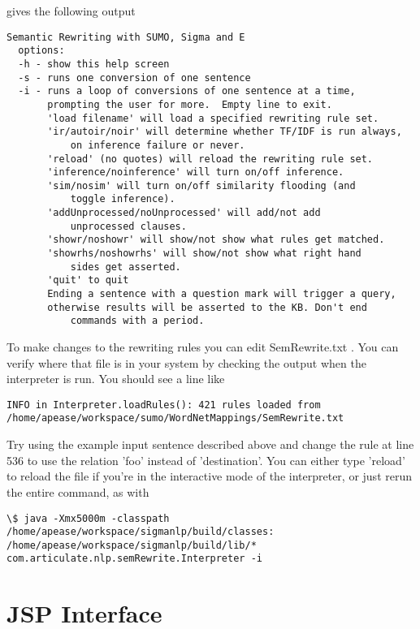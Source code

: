 \documentclass{book}
\begin{document}
gives the following output

\begin{verbatim}
Semantic Rewriting with SUMO, Sigma and E
  options:
  -h - show this help screen
  -s - runs one conversion of one sentence
  -i - runs a loop of conversions of one sentence at a time,
       prompting the user for more.  Empty line to exit.
       'load filename' will load a specified rewriting rule set.
       'ir/autoir/noir' will determine whether TF/IDF is run always, 
           on inference failure or never.
       'reload' (no quotes) will reload the rewriting rule set.
       'inference/noinference' will turn on/off inference.
       'sim/nosim' will turn on/off similarity flooding (and 
           toggle inference).
       'addUnprocessed/noUnprocessed' will add/not add 
           unprocessed clauses.
       'showr/noshowr' will show/not show what rules get matched.
       'showrhs/noshowrhs' will show/not show what right hand 
           sides get asserted.
       'quit' to quit
       Ending a sentence with a question mark will trigger a query,
       otherwise results will be asserted to the KB. Don't end 
           commands with a period.
\end{verbatim}

To make changes to the rewriting rules you can edit SemRewrite.txt .  You can verify
where that file is in your system by checking the output when the interpreter is run.
You should see a line like

\begin{verbatim}
INFO in Interpreter.loadRules(): 421 rules loaded from 
/home/apease/workspace/sumo/WordNetMappings/SemRewrite.txt
\end{verbatim}

Try using the example input sentence described above and change the rule at line 536
to use the relation 'foo' instead of 'destination'.  You can either type 'reload'
to reload the file if you're in the interactive mode of the interpreter, or just rerun
the entire command, as with

\begin{verbatim}
\$ java -Xmx5000m -classpath /home/apease/workspace/sigmanlp/build/classes:
/home/apease/workspace/sigmanlp/build/lib/*  
com.articulate.nlp.semRewrite.Interpreter -i
\end{verbatim}

\section{JSP Interface}
\label{chap:KnowEngi:sec:JSPInterface}
\end{document}
